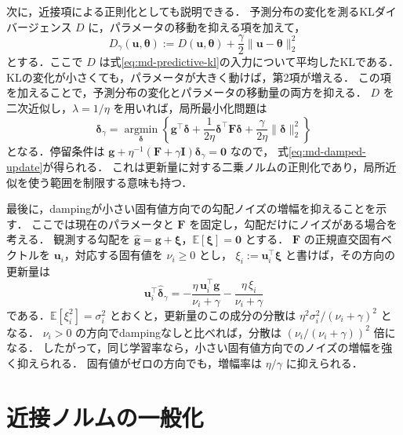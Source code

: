 \documentclass[../main.tex]{subfiles}
\begin{document}
次に，近接項による正則化としても説明できる．
予測分布の変化を測るKLダイバージェンス $D$ に，パラメータの移動を抑える項を加えて，
\begin{equation}
  D_\gamma(\bm{u},\bm{\theta})
  :=D(\bm{u},\bm{\theta})
  +\frac{\gamma}{2}\|\bm{u}-\bm{\theta}\|_2^2
  \label{eq:md-damped-divergence}
\end{equation}
とする．ここで $D$ は式\eqref{eq:md-predictive-kl}の入力について平均したKLである．
KLの変化が小さくても，パラメータが大きく動けば，第2項が増える．
この項を加えることで，予測分布の変化とパラメータの移動量の両方を抑える．
$D$ を二次近似し，$\lambda=1/\eta$ を用いれば，局所最小化問題は
\begin{equation}
  \bm{\delta}_\gamma
  =\underset{\bm{\delta}}{\operatorname{argmin}}
  \left\{\bm{g}^\top\bm{\delta}
  +\frac{1}{2\eta}\bm{\delta}^\top\bm{F}\bm{\delta}
  +\frac{\gamma}{2\eta}\|\bm{\delta}\|_2^2\right\}
  \label{eq:md-damped-proximal-model}
\end{equation}
となる．停留条件は $\bm{g}+\eta^{-1}(\bm{F}+\gamma\bm{I})\bm{\delta}_\gamma=\bm{0}$ なので，
式\eqref{eq:md-damped-update}が得られる．
これは更新量に対する二乗ノルムの正則化であり，局所近似を使う範囲を制限する意味も持つ\cite{martens2020natural}．

最後に，dampingが小さい固有値方向での勾配ノイズの増幅を抑えることを示す．
ここでは現在のパラメータと $\bm{F}$ を固定し，勾配だけにノイズがある場合を考える．
観測する勾配を $\widehat{\bm{g}}=\bm{g}+\bm{\xi}$，$\mathbb{E}[\bm{\xi}]=\bm{0}$ とする．
$\bm{F}$ の正規直交固有ベクトルを $\bm{u}_i$，対応する固有値を $\nu_i\geq0$ とし，
$\xi_i:=\bm{u}_i^\top\bm{\xi}$ と書けば，その方向の更新量は
\begin{equation}
  \bm{u}_i^\top\widehat{\bm{\delta}}_\gamma
  =-\frac{\eta\,\bm{u}_i^\top\bm{g}}{\nu_i+\gamma}
  -\frac{\eta\,\xi_i}{\nu_i+\gamma}
  \label{eq:md-damped-noisy-direction}
\end{equation}
である．$\mathbb{E}[\xi_i^2]=\sigma_i^2$ とおくと，更新量のこの成分の分散は
$\eta^2\sigma_i^2/(\nu_i+\gamma)^2$ となる．
$\nu_i>0$ の方向でdampingなしと比べれば，分散は $(\nu_i/(\nu_i+\gamma))^2$ 倍になる．
したがって，同じ学習率なら，小さい固有値方向でのノイズの増幅を強く抑えられる．
固有値がゼロの方向でも，増幅率は $\eta/\gamma$ に抑えられる．

\section{近接ノルムの一般化}
\label{sec:md-proximal-norms}
\end{document}
